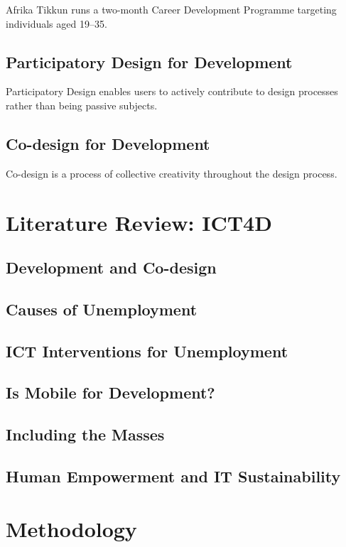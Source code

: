 \documentclass[12pt,a4paper]{report}
\begin{document}
Afrika Tikkun runs a two-month Career Development Programme targeting individuals aged 19–35.

\section{Participatory Design for Development}

Participatory Design enables users to actively contribute to design processes rather than being passive subjects.

\section{Co-design for Development}

Co-design is a process of collective creativity throughout the design process.

\chapter{Literature Review: ICT4D}

\section{Development and Co-design}
\section{Causes of Unemployment}
\section{ICT Interventions for Unemployment}
\section{Is Mobile for Development?}
\section{Including the Masses}
\section{Human Empowerment and IT Sustainability}

\chapter{Methodology}
\end{document}
